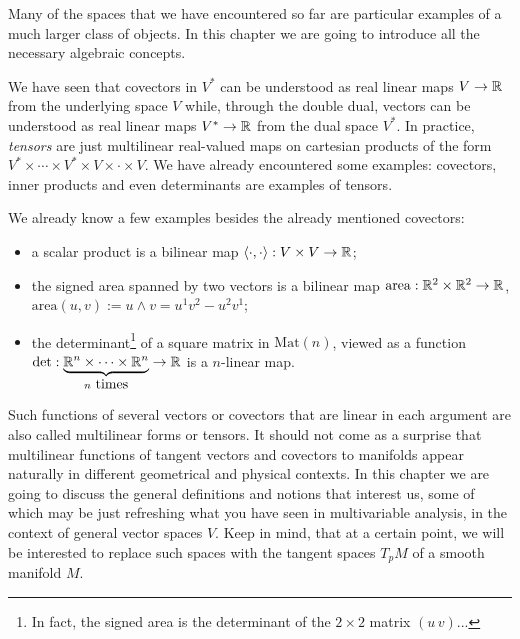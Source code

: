 Many of the spaces that we have encountered so far are particular examples of a much larger class of objects.
In this chapter we are going to introduce all the necessary algebraic concepts.

We have seen that covectors in $V^*$ can be understood as real linear maps $V\to\mathbb{R}$ from the underlying space $V$ while, through the double dual, vectors can be understood as real linear maps $V^*\to\mathbb{R}$ from the dual space $V^*$.
In practice, \emph{tensors} are just multilinear real-valued maps on cartesian products of the form $V^*\times \cdots \times V^* \times V \times \cdot \times V$.
We have already encountered some examples: covectors, inner products and even determinants are examples of tensors.

We already know a few examples besides the already mentioned covectors:
\begin{itemize}
  \item a scalar product is a bilinear map $\langle\cdot,\cdot\rangle:V\times V\to \mathbb{R}$;
  \item the signed area spanned by two vectors is a bilinear map $\mathrm{area}: \mathbb{R}^2\times\mathbb{R}^2\to\mathbb{R}$, $\mathrm{area}(u,v) := u\wedge v = u^1v^2-u^2v^1$;
  \item the determinant\footnote{In fact, the signed area is the determinant of the $2\times 2$ matrix $(u \, v)$...} of a square matrix in $\mathrm{Mat}(n)$, viewed as a function $\det: \LaTeXunderbrace{\R^n\times\cdots\times\R^n}_{n\mbox{ times}}\to\R$ is a $n$-linear map.
\end{itemize}

Such functions of several vectors or covectors that are linear in each argument are also called multilinear forms or tensors.
It should not come as a surprise that multilinear functions of tangent vectors and covectors to manifolds appear naturally in different geometrical and physical contexts.
In this chapter we are going to discuss the general definitions and notions that interest us, some of which may be just refreshing what you have seen in multivariable analysis, in the context of general vector spaces $V$.
Keep in mind, that at a certain point, we will be interested to replace such spaces with the tangent spaces $T_pM$ of a smooth manifold $M$.

